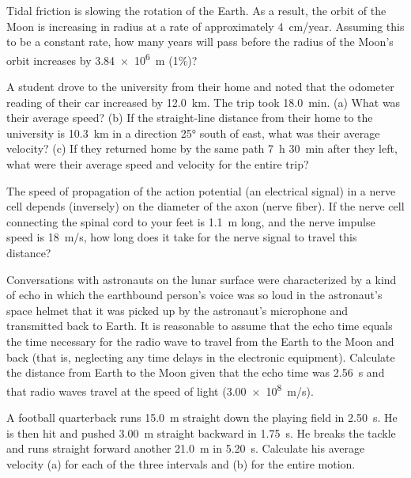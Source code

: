 \documentclass[../../main-ap-physics.tex]{subfiles}
\begin{document}
\begin{exercise}
    Tidal friction is slowing the rotation of the Earth. As a result, the orbit of the Moon is increasing in radius at a rate of approximately \SI{4}{cm/year}. Assuming this to be a constant rate, how many years will pass before the radius of the Moon’s orbit increases by \SI{3.84e6}{m} (1\%)?
\end{exercise}

\begin{exercise}
    A student drove to the university from their home and noted that the odometer reading of their car increased by \SI{12.0}{km}. The trip took \SI{18.0}{min}. (a) What was their average speed? (b) If the straight-line distance from their home to the university is \SI{10.3}{km} in a direction \ang{25} south of east, what was their average velocity? (c) If they returned home by the same path \SI{7}{h} \SI{30}{min} after they left, what were their average speed and velocity for the entire trip?
\end{exercise}

\begin{exercise}
    The speed of propagation of the action potential (an electrical signal) in a nerve cell depends (inversely) on the diameter of the axon (nerve fiber). If the nerve cell connecting the spinal cord to your feet is \SI{1.1}{m} long, and the nerve impulse speed is \SI{18}{m/s}, how long does it take for the nerve signal to travel this distance?
\end{exercise}

\begin{exercise}
    Conversations with astronauts on the lunar surface were characterized by a kind of echo in which the earthbound person's voice was so loud in the astronaut's space helmet that it was picked up by the astronaut's microphone and transmitted back to Earth. It is reasonable to assume that the echo time equals the time necessary for the radio wave to travel from the Earth to the Moon and back (that is, neglecting any time delays in the electronic equipment). Calculate the distance from Earth to the Moon given that the echo time was \SI{2.56}{s} and that radio waves travel at the speed of light (\SI{3.00e8}{m/s}).
\end{exercise}

\begin{exercise}
    A football quarterback runs \SI{15.0}{m} straight down the playing field in \SI{2.50}{s}. He is then hit and pushed \SI{3.00}{m} straight backward in \SI{1.75}{s}. He breaks the tackle and runs straight forward another \SI{21.0}{m} in \SI{5.20}{s}. Calculate his average velocity (a) for each of the three intervals and (b) for the entire motion.
\end{exercise}
\end{document}
